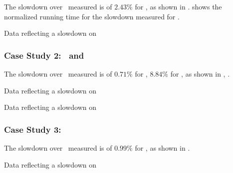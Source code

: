 The slowdown over \llvm\ measured is of $2.43 \%$ for \gcc, as shown in .  shows the normalized running time for the slowdown measured for \gcc.

\begin{table}
  \centering
  \begin{tiny}
  
  \end{tiny}
  \caption{Data reflecting a slowdown on \gcc}
  \label{tab:slowdowngcc}
\end{table}


\subsubsection{Case Study 2: \bzip\  and \gzip}

The slowdown over \llvm\ measured is of $0.71 \%$ for \bzip, $8.84 \%$ for \gzip, as shown in , .

\begin{table}
  \centering
  \begin{tiny}
  
  \end{tiny}
  \caption{Data reflecting a slowdown on \bzip}
  \label{tab:slowdownb}
\end{table}

\begin{table}
  \centering
  \begin{tiny}
  
  \end{tiny}
  \caption{Data reflecting a slowdown on \gzip}
  \label{tab:slowdownz}
\end{table}

\subsubsection{Case Study 3: \gobmk}

The slowdown over \llvm\ measured is of $0.99 \%$ for \gobmk, as shown in .

\begin{table}
  \centering
  \begin{tiny}
  
  \end{tiny}
  \caption{Data reflecting a slowdown on \gobmk}
  \label{tab:slowdowngobmk}
\end{table}
